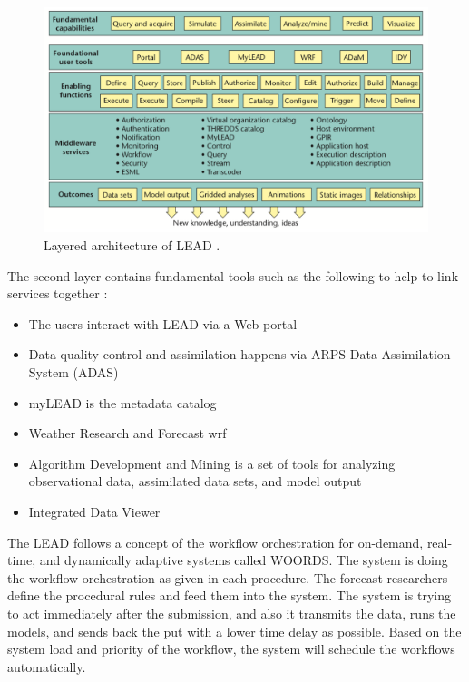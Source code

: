 \begin{figure}[htp]
    \centering
    \includegraphics[width=1.0\textwidth]{lit/lead/LEAD-system-Fundamental-capabilities-familiar-to-meteorologists-are-shown-in-the-top_W640.png}
    \caption[Layered architecture of LEAD]{Layered architecture of LEAD \cite{Droegemeier2005Service-OrientedWeather}.}
    \label{fi:lead_system}
\end{figure}

The second layer contains fundamental tools such as the following to help to link services together \cite{Droegemeier2005Service-OrientedWeather}:
\begin{itemize}
    \item The users interact with LEAD via a Web portal
    \item Data quality control and assimilation happens via ARPS Data Assimilation System (ADAS)
    \item myLEAD is the metadata catalog
    \item Weather Research and Forecast \acrfull{wrf} \cite{MesoscaleMicroscaleMeteorologyLaboratoryWeatherModel}
    \item Algorithm Development and Mining is a set of tools for analyzing observational data, assimilated data sets, and model output
    \item Integrated Data Viewer 
\end{itemize}

The LEAD follows a concept of the workflow orchestration for on-demand, real-time, and dynamically adaptive systems called WOORDS. The system is doing the workflow orchestration as given in each procedure. The forecast researchers define the procedural rules and feed them into the system. The system is trying to act immediately after the submission, and also it transmits the data, runs the models, and sends back the put with a lower time delay as possible. Based on the system load and priority of the workflow, the system will schedule the workflows automatically.

